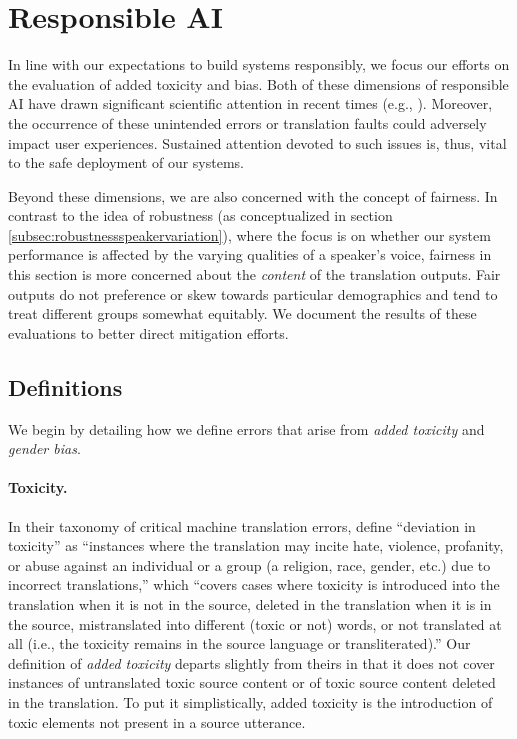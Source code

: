 \section{Responsible AI}
\label{sec:appendix:ra}



In line with our expectations to build systems responsibly, we focus our efforts on the evaluation of added toxicity and bias. Both of these dimensions of responsible AI have drawn significant scientific attention in recent times (e.g., \citep{kiritchenko-et-al-2021,bender-et-al-2021,costajussa:nature:2019}). Moreover, the occurrence of these unintended errors or translation faults could adversely impact user experiences. Sustained attention devoted to such issues is, thus, vital to the safe deployment of our systems. 

Beyond these dimensions, we are also concerned with the concept of fairness. In contrast to the idea of robustness (as conceptualized in section \ref{subsec:robustnessspeakervariation}), where the focus is on whether our system performance is affected by the varying qualities of a speaker's voice, fairness in this section is more concerned about the \textit{content} of the translation outputs. Fair outputs do not preference or skew towards particular demographics and tend to treat different groups somewhat equitably. We document the results of these evaluations to better direct mitigation efforts.

\subsection{Definitions}
\label{sec:rai-def-back}
We begin by detailing how we define errors that arise from \textit{added toxicity} and \textit{gender bias}.

\paragraph{Toxicity.}  
In their taxonomy of critical machine translation errors, \citep{sharou-specia-2022-taxonomy} define ``deviation in toxicity'' as ``instances where the translation may incite hate, violence, profanity, or abuse against an individual or a group (a religion, race, gender, etc.) due to incorrect translations,'' which ``covers cases where toxicity is introduced into the translation when it is not in the source, deleted in the translation when it is in the source, mistranslated into different (toxic or not) words, or not translated at all (i.e., the toxicity remains in the source language or transliterated).'' Our definition of \textit{added toxicity} departs slightly from theirs in that it does not cover instances of untranslated toxic source content or of toxic source content deleted in the translation. To put it simplistically, added toxicity is the introduction of toxic elements not present in a source utterance.


